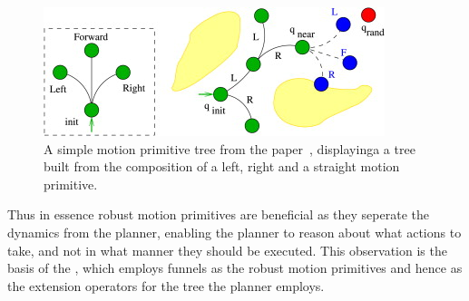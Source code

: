 \begin{figure}
  \centering
  \includegraphics[scale=.5]{figures/preliminaries/motion-primitive-tree}
  \caption{A simple motion primitive tree from the
    paper~\cite{vonasekHighlevelMotionPlanning2015}, displayinga a tree built
    from the composition of a left, right and a straight motion primitive.}
  \label{fig:motion-primitive-tree}
\end{figure}

Thus in essence robust motion primitives are beneficial as they seperate the
dynamics from the planner, enabling the planner to reason about what actions to
take, and not in what manner they should be executed. This observation is the
basis of the \rrtfunnel{}, which employs funnels as the robust motion primitives
and hence as the extension operators for the tree the planner employs.

